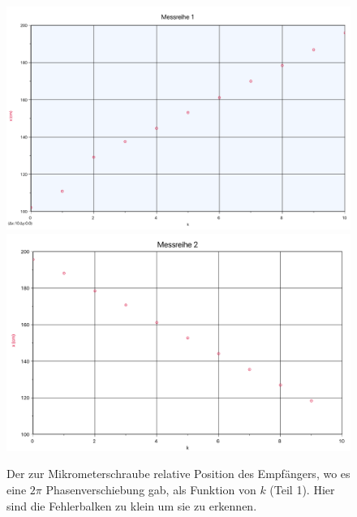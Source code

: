 \documentclass[11pt,a4paper]{article}
\begin{document}
\begin{figure}[p]
	\centering
	\includegraphics[width=\linewidth]{Anhang1}
	\includegraphics[width=\linewidth]{Anhang2}
	\caption{Der zur Mikrometerschraube relative Position des Empfängers, wo es eine $2\pi$ Phasenverschiebung gab, als Funktion von $k$ (Teil 1). Hier sind die Fehlerbalken zu klein um sie zu erkennen.}
\end{figure}
\end{document}
